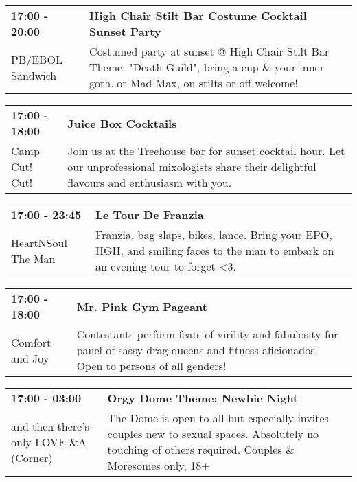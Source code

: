 \begin{tabular}{ p{1in} p{2.2in} }
    \textbf{17:00 - 20:00} & \textbf{High Chair Stilt Bar Costume Cocktail Sunset Party} \\
    PB/EBOL Sandwich \newline  & Costumed party at sunset @ High Chair Stilt Bar Theme: "Death Guild", bring a cup \& your inner goth..or Mad Max, on stilts or off welcome! \\
    \hline 
\end{tabular}
    
\begin{tabular}{ p{1in} p{2.2in} }
    \textbf{17:00 - 18:00} & \textbf{Juice Box Cocktails} \\
    Camp Cut! Cut! \newline  & Join us at the Treehouse bar for sunset cocktail hour. Let our unprofessional mixologists share their  delightful flavours and enthusiasm with you. \\
    \hline 
\end{tabular}
    
\begin{tabular}{ p{1in} p{2.2in} }
    \textbf{17:00 - 23:45} & \textbf{Le Tour De Franzia} \\
    HeartNSoul \newline The Man & Franzia, bag slaps, bikes, lance. Bring your EPO, HGH, and smiling faces to the man to embark on an evening tour to forget <3. \\
    \hline 
\end{tabular}
    
\begin{tabular}{ p{1in} p{2.2in} }
    \textbf{17:00 - 18:00} & \textbf{Mr. Pink Gym Pageant} \\
    Comfort and Joy \newline  & Contestants perform feats of virility and fabulosity for panel of sassy drag queens and fitness aficionados.  Open to persons of all genders! \\
    \hline 
\end{tabular}
    
\begin{tabular}{ p{1in} p{2.2in} }
    \textbf{17:00 - 03:00} & \textbf{Orgy Dome Theme: Newbie Night} \\
    and then there's only LOVE \newline 4\&A (Corner) & The Dome is open to all but especially invites couples new to sexual spaces. Absolutely no touching of others required. Couples \& Moresomes only, 18+ \\
    \hline 
\end{tabular}
    
